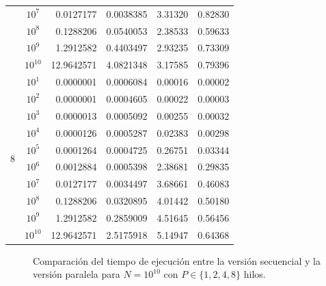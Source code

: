 \documentclass[11pt,a4paper]{article}
\begin{document}
\begin{longtable}{ccrrrr}
 & $10^7$ & 0.0127177 & 0.0038385 & 3.31320 & 0.82830 \\
 & $10^8$ & 0.1288206 & 0.0540053 & 2.38533 & 0.59633 \\
 & $10^9$ & 1.2912582 & 0.4403497 & 2.93235 & 0.73309 \\
 & $10^{10}$ & 12.9642571 & 4.0821348 & 3.17585 & 0.79396 \\ \hline
\multirow{10}{*}{8} 
 & $10^1$ & 0.0000001 & 0.0006084 & 0.00016 & 0.00002 \\
 & $10^2$ & 0.0000001 & 0.0004605 & 0.00022 & 0.00003 \\
 & $10^3$ & 0.0000013 & 0.0005092 & 0.00255 & 0.00032 \\
 & $10^4$ & 0.0000126 & 0.0005287 & 0.02383 & 0.00298 \\
 & $10^5$ & 0.0001264 & 0.0004725 & 0.26751 & 0.03344 \\
 & $10^6$ & 0.0012884 & 0.0005398 & 2.38681 & 0.29835 \\
 & $10^7$ & 0.0127177 & 0.0034497 & 3.68661 & 0.46083 \\
 & $10^8$ & 0.1288206 & 0.0320895 & 4.01442 & 0.50180 \\
 & $10^9$ & 1.2912582 & 0.2859009 & 4.51645 & 0.56456 \\
 & $10^{10}$ & 12.9642571 & 2.5175918 & 5.14947 & 0.64368 \\
\end{longtable}




\begin{figure}[H]
\centering
{}
\caption{Comparación del tiempo de ejecución entre la versión secuencial y la versión paralela para $N = 10^{10}$ con $P \in \{1, 2, 4, 8\}$ hilos.}
\label{fig:tiempo_secuencial_vs_paralelo_parte1}
\end{figure}
\end{document}

